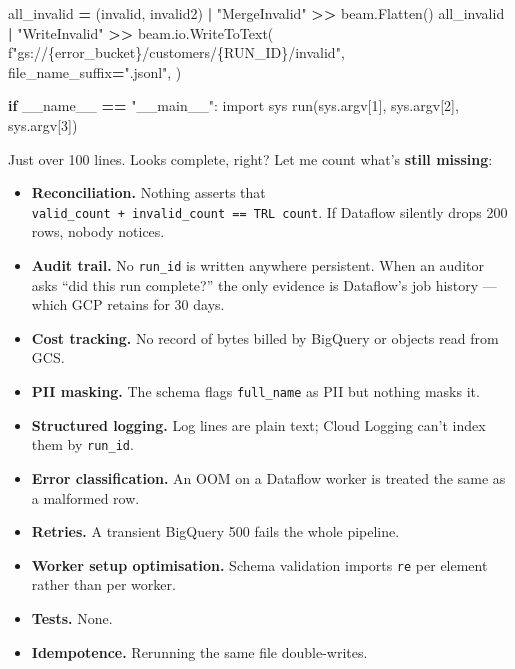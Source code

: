 \documentclass[
  11pt,
  british,
  oneside]{book}
\newenvironment{Shaded}{\begin{snugshade}}{\end{snugshade}}
\newcommand{\ControlFlowTok}[1]{\textcolor[rgb]{0.13,0.29,0.53}{\textbf{#1}}}
\newcommand{\DecValTok}[1]{\textcolor[rgb]{0.00,0.00,0.81}{#1}}
\newcommand{\ImportTok}[1]{#1}
\newcommand{\NormalTok}[1]{#1}
\newcommand{\OperatorTok}[1]{\textcolor[rgb]{0.81,0.36,0.00}{\textbf{#1}}}
\newcommand{\SpecialCharTok}[1]{\textcolor[rgb]{0.00,0.00,0.00}{#1}}
\newcommand{\SpecialStringTok}[1]{\textcolor[rgb]{0.31,0.60,0.02}{#1}}
\newcommand{\StringTok}[1]{\textcolor[rgb]{0.31,0.60,0.02}{#1}}
\newcommand{\VariableTok}[1]{\textcolor[rgb]{0.00,0.00,0.00}{#1}}
\providecommand{\tightlist}{%
  \setlength{\itemsep}{0pt}\setlength{\parskip}{0pt}}
\begin{document}
\begin{Shaded}
\begin{Highlighting}[]
\NormalTok{        all\_invalid }\OperatorTok{=}\NormalTok{ (invalid, invalid2) }\OperatorTok{|} \StringTok{"MergeInvalid"} \OperatorTok{\textgreater{}\textgreater{}}\NormalTok{ beam.Flatten()}
\NormalTok{        all\_invalid }\OperatorTok{|} \StringTok{"WriteInvalid"} \OperatorTok{\textgreater{}\textgreater{}}\NormalTok{ beam.io.WriteToText(}
            \SpecialStringTok{f"gs://}\SpecialCharTok{\{}\NormalTok{error\_bucket}\SpecialCharTok{\}}\SpecialStringTok{/customers/}\SpecialCharTok{\{}\NormalTok{RUN\_ID}\SpecialCharTok{\}}\SpecialStringTok{/invalid"}\NormalTok{,}
\NormalTok{            file\_name\_suffix}\OperatorTok{=}\StringTok{".jsonl"}\NormalTok{,}
\NormalTok{        )}

\ControlFlowTok{if} \VariableTok{\_\_name\_\_} \OperatorTok{==} \StringTok{"\_\_main\_\_"}\NormalTok{:}
    \ImportTok{import}\NormalTok{ sys}
\NormalTok{    run(sys.argv[}\DecValTok{1}\NormalTok{], sys.argv[}\DecValTok{2}\NormalTok{], sys.argv[}\DecValTok{3}\NormalTok{])}
\end{Highlighting}
\end{Shaded}

Just over 100 lines. Looks complete, right? Let me count what's
\textbf{still missing}:

\begin{itemize}
\tightlist
\item
  \textbf{Reconciliation.} Nothing asserts that
  \texttt{valid\_count\ +\ invalid\_count\ ==\ TRL\ count}. If Dataflow
  silently drops 200 rows, nobody notices.
\item
  \textbf{Audit trail.} No \texttt{run\_id} is written anywhere
  persistent. When an auditor asks ``did this run complete?'' the only
  evidence is Dataflow's job history --- which GCP retains for 30 days.
\item
  \textbf{Cost tracking.} No record of bytes billed by BigQuery or
  objects read from GCS.
\item
  \textbf{PII masking.} The schema flags \texttt{full\_name} as PII but
  nothing masks it.
\item
  \textbf{Structured logging.} Log lines are plain text; Cloud Logging
  can't index them by \texttt{run\_id}.
\item
  \textbf{Error classification.} An OOM on a Dataflow worker is treated
  the same as a malformed row.
\item
  \textbf{Retries.} A transient BigQuery 500 fails the whole pipeline.
\item
  \textbf{Worker setup optimisation.} Schema validation imports
  \texttt{re} per element rather than per worker.
\item
  \textbf{Tests.} None.
\item
  \textbf{Idempotence.} Rerunning the same file double-writes.
\end{itemize}
\end{document}
